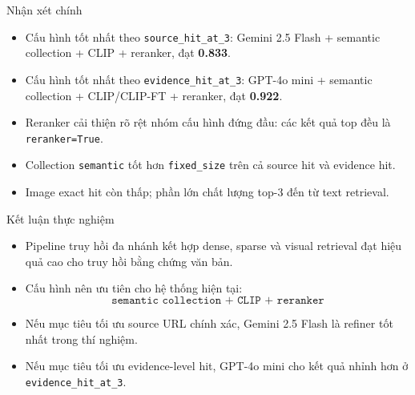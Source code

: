 \documentclass[aspectratio=169]{beamer}
\begin{document}
\begin{frame}{Nhận xét chính}
  \begin{itemize}
    \item Cấu hình tốt nhất theo \texttt{source\_hit\_at\_3}: Gemini 2.5 Flash + semantic collection + CLIP + reranker, đạt \textbf{0.833}.
    \item Cấu hình tốt nhất theo \texttt{evidence\_hit\_at\_3}: GPT-4o mini + semantic collection + CLIP/CLIP-FT + reranker, đạt \textbf{0.922}.
    \item Reranker cải thiện rõ rệt nhóm cấu hình đứng đầu: các kết quả top đều là \texttt{reranker=True}.
    \item Collection \texttt{semantic} tốt hơn \texttt{fixed\_size} trên cả source hit và evidence hit.
    \item Image exact hit còn thấp; phần lớn chất lượng top-3 đến từ text retrieval.
  \end{itemize}
\end{frame}

\begin{frame}{Kết luận thực nghiệm}
  \begin{itemize}
    \item Pipeline truy hồi đa nhánh kết hợp dense, sparse và visual retrieval đạt hiệu quả cao cho truy hồi bằng chứng văn bản.
    \item Cấu hình nên ưu tiên cho hệ thống hiện tại:
    \[
      \texttt{semantic collection + CLIP + reranker}
    \]
    \item Nếu mục tiêu tối ưu source URL chính xác, Gemini 2.5 Flash là refiner tốt nhất trong thí nghiệm.
    \item Nếu mục tiêu tối ưu evidence-level hit, GPT-4o mini cho kết quả nhỉnh hơn ở \texttt{evidence\_hit\_at\_3}.
  \end{itemize}
\end{frame}
\end{document}
